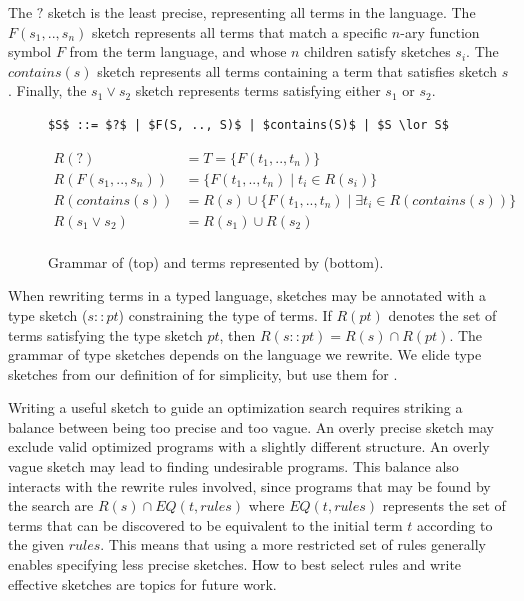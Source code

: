 The $?$ sketch is the least precise, representing all terms in the language.
The $F(s_1, .., s_n)$ sketch represents all terms that match a specific $n$-ary function symbol $F$ from the term language, and whose $n$ children satisfy sketches $s_i$.
The $contains(s)$ sketch represents all terms containing a term that satisfies sketch $s$.
Finally, the $s_1 \lor s_2$ sketch represents terms satisfying either $s_1$ or $s_2$.

\begin{figure}
  \begin{lstlisting}[mathescape, basicstyle={\linespread{.75}\ttfamily\normalsize}, frame=none, xleftmargin=0.25\linewidth]
  $S$ ::= $?$ | $F(S, .., S)$ | $contains(S)$ | $S \lor S$
  \end{lstlisting}
    \begin{align*}
      R(?) &= T = \{ F(t_1, .., t_n) \} \\
      R(F(s_1, .., s_n)) &= \{ F(t_1, .., t_n) \mid t_i \in R(s_i) \} \\
      R(contains(s)) &= R(s) \cup \{ F(t_1, .., t_n) \mid \exists t_i \in R(contains(s)) \} \\
      R(s_1 \lor s_2) &= R(s_1) \cup R(s_2)\\[-2em]
    \end{align*}
    \caption{Grammar of \sLang{} (top) and terms represented by \sLang{} (bottom).}
    \label{fig:sketch-lang-rep}
\end{figure}

When rewriting terms in a typed language, sketches may be annotated with a type sketch ($s :: pt$) constraining the type of terms.
If $R(pt)$ denotes the set of terms satisfying the type sketch $pt$, then $R(s :: pt) = R(s) \cap R(pt)$.
The grammar of type sketches depends on the language we rewrite.
We elide type sketches from our definition of \sLang{} for simplicity, but use them for \Rise{}.

Writing a useful sketch to guide an optimization search requires striking a balance between being too precise and too vague.
An overly precise sketch may exclude valid optimized programs with a slightly different structure.
An overly vague sketch may lead to finding undesirable programs.
This balance also interacts with the rewrite rules involved, since programs that may be found by the search are $R(s) \cap EQ(t, rules)$ where $EQ(t, rules)$ represents the set of terms that can be discovered to be equivalent to the initial term $t$ according to the given $rules$.
This means that using a more restricted set of rules generally enables specifying less precise sketches.
How to best select rules and write effective sketches are topics for future work.

